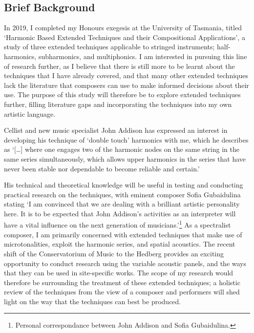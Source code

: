 \subsection{Brief Background}
In 2019, I completed my Honours exegesis at the University of Tasmania, titled `Harmonic Based Extended Techniques and their Compositional Applications', a study of three extended techniques applicable to stringed instruments; half-harmonics, subharmonics, and multiphonics.
I am interested in pursuing this line of research further, as I believe that there is still more to be learnt about the techniques that I have already covered, and that many other extended techniques lack the literature that composers can use to make informed decisions about their use. 
The purpose of this study will therefore be to explore extended techniques further, filling literature gaps and incorporating the techniques into my own artistic language.

Cellist and new music specialist John Addison has expressed an interest in developing his technique of `double touch' harmonics with me, which he describes as `[\ldots] where one engages two of the harmonic nodes on the same string in the same series simultaneously, which allows upper harmonics in the series that have never been stable nor dependable to become reliable and certain.'


His technical and theoretical knowledge will be useful in testing and conducting practical research on the techniques, with eminent composer Sofia Gubaidulina stating 
    `I am convinced that we are dealing with a brilliant artistic personality here. 
    It is to be expected that John Addison’s activities as an interpreter will have a vital influence on the next generation of musicians.'\footnote{Personal correspondance between John Addison and Sofia Gubaidulina.}
As a spectralist composer, I am primarily concerned with extended techniques that make use of microtonalities, exploit the harmonic series, and spatial acoustics.
The recent shift of the Conservatorium of Music to the Hedberg provides an exciting opportunity to conduct research using the variable acoustic panels, and the ways that they can be used in site-specific works. 
The scope of my research would therefore be surrounding the treatment of these extended techniques; a holistic review of the techniques from the view of a composer and performers will shed light on the way that the techniques can best be produced.


